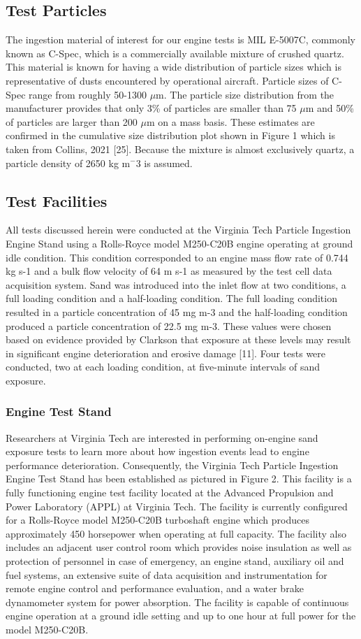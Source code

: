\documentclass[12pt]{iopart}
\begin{document}
\subsection{Test Particles}
The ingestion material of interest for our engine tests is MIL E-5007C, commonly known as C-Spec, which is a commercially available mixture of crushed quartz. This material is known for having a wide distribution of particle sizes which is representative of dusts encountered by operational aircraft. Particle sizes of C-Spec range from roughly 50-1300 $\mu$m. The particle size distribution from the manufacturer provides that only 3\% of particles are smaller than 75 $\mu$m and 50\% of particles are larger than 200 $\mu$m on a mass basis. These estimates are confirmed in the cumulative size distribution plot shown in Figure 1 which is taken from Collins, 2021 [25]. Because the mixture is almost exclusively quartz, a particle density of 2650 kg m$^-{3}$ is assumed.
\subsection{Test Facilities}
All tests discussed herein were conducted at the Virginia Tech Particle Ingestion Engine Stand using a Rolls-Royce model M250-C20B engine operating at ground idle condition. This condition corresponded to an engine mass flow rate of 0.744 kg s-1 and a bulk flow velocity of 64 m s-1 as measured by the test cell data acquisition system. Sand was introduced into the inlet flow at two conditions, a full loading condition and a half-loading condition. The full loading condition resulted in a particle concentration of 45 mg m-3 and the half-loading condition produced a particle concentration of 22.5 mg m-3. These values were chosen based on evidence provided by Clarkson that exposure at these levels may result in significant engine deterioration and erosive damage [11]. Four tests were conducted, two at each loading condition, at five-minute intervals of sand exposure. 
\subsubsection{Engine Test Stand}
Researchers at Virginia Tech are interested in performing on-engine sand exposure tests to learn more about how ingestion events lead to engine performance deterioration. Consequently, the Virginia Tech Particle Ingestion Engine Test Stand has been established as pictured in Figure 2. This facility is a fully functioning engine test facility located at the Advanced Propulsion and Power Laboratory (APPL) at Virginia Tech. The facility is currently configured for a Rolls-Royce model M250-C20B turboshaft engine which produces approximately 450 horsepower when operating at full capacity. The facility also includes an adjacent user control room which provides noise insulation as well as protection of personnel in case of emergency, an engine stand, auxiliary oil and fuel systems, an extensive suite of data acquisition and instrumentation for remote engine control and performance evaluation, and a water brake dynamometer system for power absorption. The facility is capable of continuous engine operation at a ground idle setting and up to one hour at full power for the model M250-C20B.
\end{document}
